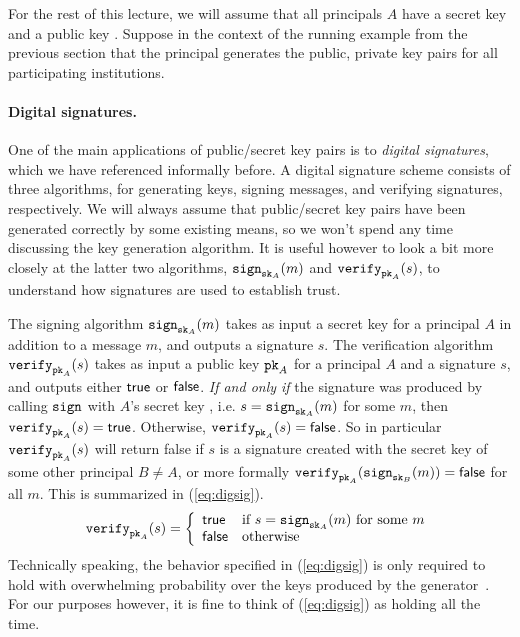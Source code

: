 \documentclass[11pt,twoside]{scrartcl}
\begin{document}
For the rest of this lecture, we will assume that all principals $A$ have a secret key  and a public key . Suppose in the context of the running example from the previous section that the \eduroam principal generates the public, private key pairs for all participating institutions. 

\paragraph{Digital signatures.} One of the main applications of public/secret key pairs is to \emph{digital signatures}, which we have referenced informally before. A digital signature scheme consists of three algorithms, for generating keys, signing messages, and verifying signatures, respectively. We will always assume that public/secret key pairs have been generated correctly by some existing means, so we won't spend any time discussing the key generation algorithm. It is useful however to look a bit more closely at the latter two algorithms, $\texttt{\upshape sign}_{\texttt{\upshape sk}_{A}}(m)$ and $\texttt{\upshape verify}_{\texttt{\upshape pk}_{A}}(s)$, to understand how signatures are used to establish trust.

The signing algorithm $\texttt{\upshape sign}_{\texttt{\upshape sk}_{A}}(m)$ takes as input a secret key  for a principal $A$ in addition to a message $m$, and outputs a signature $s$. The verification algorithm $\texttt{\upshape verify}_{\texttt{\upshape pk}_{A}}(s)$ takes as input a public key $\texttt{\upshape pk}_{A}$ for a principal $A$ and a signature $s$, and outputs either $\mathsf{true}$ or $\mathsf{false}$. \emph{If and only if} the signature was produced by calling $\texttt{\upshape sign}$ with $A$'s secret key , i.e. $s = \texttt{\upshape sign}_{\texttt{\upshape sk}_{A}}(m)$ for some $m$, then $\texttt{\upshape verify}_{\texttt{\upshape pk}_{A}}(s) = \mathsf{true}$. Otherwise, $\texttt{\upshape verify}_{\texttt{\upshape pk}_{A}}(s) = \mathsf{false}$. So in particular $\texttt{\upshape verify}_{\texttt{\upshape pk}_{A}}(s)$ will return false if $s$ is a signature created with the secret key of some other principal $B \ne A$, or more formally $\texttt{\upshape verify}_{\texttt{\upshape pk}_{A}}(\texttt{\upshape sign}_{\texttt{\upshape sk}_{B}}(m)) = \mathsf{false}$ for all $m$. This is summarized in (\ref{eq:digsig}).
\begin{equation}
\label{eq:digsig}
\verify{\pk{A}}{s} =
\left\{
\begin{array}{ll}
\strue & \text{if}~s = \sign{\sk{A}}{m}~\text{for some}~m \\
\sfalse & \text{otherwise}
\end{array}
\right.
\end{equation}
Technically speaking, the behavior specified in (\ref{eq:digsig}) is only required to hold with overwhelming probability over the keys produced by the generator~\cite{Katz2014}. For our purposes however, it is fine to think of (\ref{eq:digsig}) as holding all the time.
\end{document}
